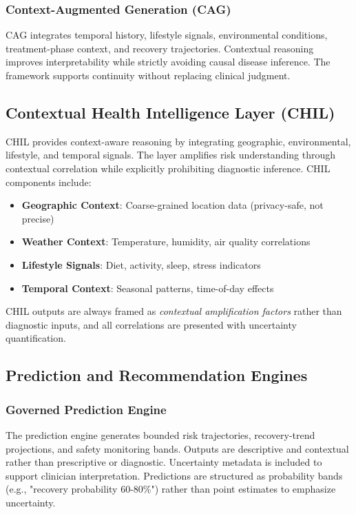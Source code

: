 \documentclass[journal]{IEEEtran}
\begin{document}
\subsubsection{Context-Augmented Generation (CAG)}
CAG integrates temporal history, lifestyle signals, environmental conditions, treatment-phase context, and recovery trajectories. Contextual reasoning improves interpretability while strictly avoiding causal disease inference. The framework supports continuity without replacing clinical judgment.

\subsection{Contextual Health Intelligence Layer (CHIL)}
CHIL provides context-aware reasoning by integrating geographic, environmental, lifestyle, and temporal signals. The layer amplifies risk understanding through contextual correlation while explicitly prohibiting diagnostic inference. CHIL components include:

\begin{itemize}
    \item \textbf{Geographic Context}: Coarse-grained location data (privacy-safe, not precise)
    \item \textbf{Weather Context}: Temperature, humidity, air quality correlations
    \item \textbf{Lifestyle Signals}: Diet, activity, sleep, stress indicators
    \item \textbf{Temporal Context}: Seasonal patterns, time-of-day effects
\end{itemize}

CHIL outputs are always framed as \textit{contextual amplification factors} rather than diagnostic inputs, and all correlations are presented with uncertainty quantification.

\subsection{Prediction and Recommendation Engines}

\subsubsection{Governed Prediction Engine}
The prediction engine generates bounded risk trajectories, recovery-trend projections, and safety monitoring bands. Outputs are descriptive and contextual rather than prescriptive or diagnostic. Uncertainty metadata is included to support clinician interpretation. Predictions are structured as probability bands (e.g., "recovery probability 60-80\%") rather than point estimates to emphasize uncertainty.
\end{document}
